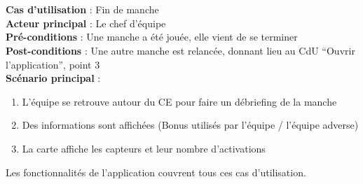\paragraph{}
~\\
\textbf{Cas d’utilisation} :  Fin de manche\\
\textbf{Acteur principal} : Le chef d’équipe\\
\textbf{Pré-conditions} : Une manche a été jouée, elle vient de se terminer\\
\textbf{Post-conditions} :  Une autre manche est relancée, donnant lieu au CdU “Ouvrir l’application”, point 3\\
\textbf{Scénario principal} :
\begin{enumerate}
 \item L’équipe se retrouve autour du CE pour faire un débriefing de la manche
 \item Des informations sont affichées (Bonus utilisés par l’équipe / l’équipe adverse)
 \item La carte affiche les capteurs et leur nombre d’activations
\end{enumerate}

Les fonctionnalités de l'application couvrent tous ces cas d'utilisation.
